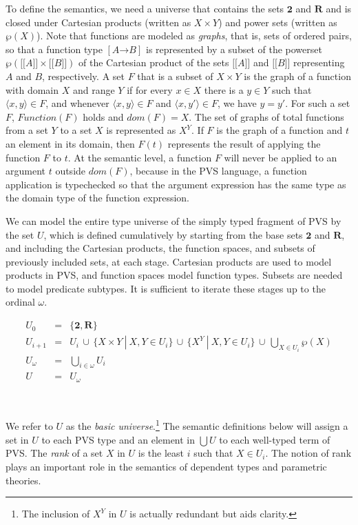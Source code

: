 \documentclass [12pt,twoside]{cslreport}
\newcommand{\thmbox}
   {{\ \hfill\hbox{%
      \vrule width1.0ex height1.0ex
   }\parfillskip 0pt }}
\newcommand{\aro}{\mathord\rightarrow} %
\newcommand{\mean}[1]{\lbrack\!\lbrack #1 \rbrack\!\rbrack}
\newcommand{\pair}[1]{\langle #1 \rangle}
\newcommand{\union}{\cup}
\newcommand{\funtype}[2]{[#1 \aro #2]}
\newcommand{\twob}{\mathbf{2}}
\newcommand{\reals}{\mathbf{R}}
\newcommand{\vbar}{\ |\ }
\newenvironment{Defn}[1]{\begin{definition}[#1]\label{defn:#1}}{
\thmbox\end{definition}}
\begin{document}
To define the semantics, we need a universe that contains the sets
$\twob$ and 
$\reals$
and is closed under Cartesian products (written as $X\times Y$)
and power sets (written as $\wp(X)$)\@.  Note that
functions are modeled as \emph{graphs}, that is, sets of ordered pairs,
so that a function type $\funtype{A}{B}$ is represented by a subset of
the powerset $\wp(\mean{A}\times \mean{B})$
of the Cartesian product of the sets $\mean{A}$ and $\mean{B}$
representing $A$ and 
$B$, respectively\@.  A set $F$ that is a subset of $X \times Y$ is the graph of a
function with domain $X$ and range $Y$ if for every $x\in X$ there is a $y\in
Y$ such that $\pair{x, y}\in F$, and whenever $\pair{x, y}\in F$
and $\pair{x, y'}\in F$, we have $y = y'$\@.  For such a set $F$,
$ \textit{Function}(F)$ holds and $ \textit{dom}(F) = X$\@.  
The set of graphs of total functions from a set $Y$ to a set $X$
is represented as $X^Y$\@.   If $F$ is the graph of a function and $t$ an
element in its domain, then
$F(t)$ represents the result of applying the function $F$ to $t$\@.
At the semantic level,  a function $F$ will never be applied to an argument
$t$ outside $\textit{dom}(F)$, because in the PVS language,
a function application is typechecked so that the
argument expression has the same type as the domain type of the
function expression.  

We can model the entire type universe of the simply typed fragment of PVS
by the set $U$, which is defined cumulatively by starting from the base
sets $\twob$ and $\reals$, and including the Cartesian products, the
function spaces, and subsets of previously included sets, at each stage.
Cartesian products are used to model products in PVS, and function spaces
model function types.  Subsets are needed to model predicate subtypes.
It is sufficient to iterate these stages up to the ordinal $\omega$\@.
\begin{Defn}{type universe}
\begin{eqnarray*}
  U_0 & = & \{ {\twob}, {\reals}  \} \\
  U_{i+1} & = & U_i \,\union\, \{X\times Y \vbar X, Y \in U_i\} \,\union\,
                           \{X^Y \vbar X, Y \in U_i \} \,\union\,
                           \bigcup_{X\in U_i}\wp(X)\\
  U_{\omega} & = & \bigcup_{i\in\omega} U_i\\
  U & = & U_{\omega}
\end{eqnarray*}
\end{Defn}


We refer to $U$ as the \emph{basic universe}.\footnote{The inclusion of $X^Y$ in $U$ is actually redundant but aids clarity.}   The semantic definitions
below will assign a set in $U$ to each PVS type and an element
in $\bigcup U$ to each well-typed term of PVS.  The \emph{rank} of a set
$X$ in $U$ is the least $i$ such that $X\in U_i$\@.  The notion of rank
plays an important role in the semantics of dependent types and
parametric theories.
\end{document}
